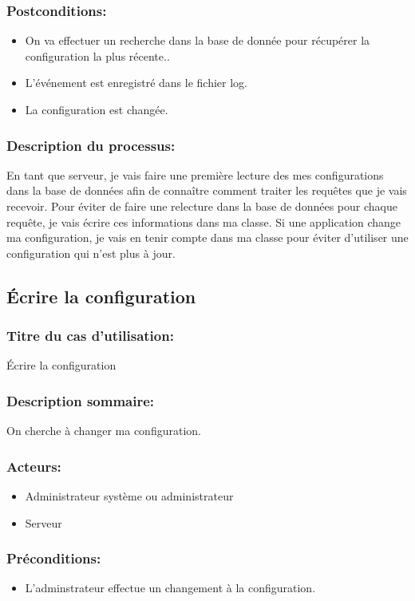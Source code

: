 \documentclass{scrreprt}
\begin{document}
\subsubsection{Postconditions:}
\begin{itemize}
    \item On va effectuer un recherche dans la base de donnée pour récupérer la configuration la plus récente..
    \item L'événement est enregistré dans le fichier log.
    \item La configuration est changée.

\end{itemize} 
\subsubsection{Description du processus:}En tant que serveur, je vais faire une première lecture des mes configurations dans la base de données afin de connaître comment traiter les requêtes que je vais recevoir.
Pour éviter de faire une relecture dans la base de données pour chaque requête,
je vais écrire ces informations dans ma classe.
Si une application change ma configuration, je vais en tenir compte dans ma
classe pour éviter d'utiliser une configuration qui n'est plus à jour.

\subsection{Écrire la configuration}
\subsubsection{Titre du cas d'utilisation:} Écrire la configuration
\subsubsection{Description sommaire:} On cherche à changer ma configuration.
\subsubsection{Acteurs:} 
\begin{itemize}
    \item Administrateur système ou administrateur
    \item Serveur
\end{itemize}
\subsubsection{Préconditions:}
\begin{itemize}
    \item L'adminstrateur effectue un changement à la configuration.
\end{itemize} 
\end{document}
